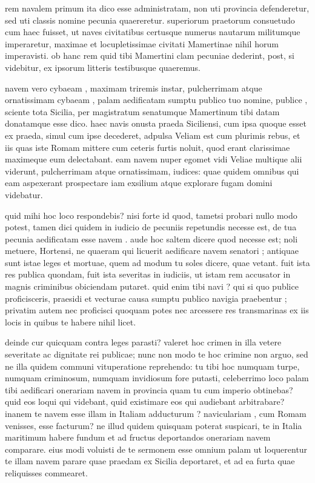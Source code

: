  rem navalem primum ita dico esse administratam, non uti provincia defenderetur, sed uti classis nomine pecunia quaereretur. superiorum praetorum consuetudo cum haec fuisset, ut naves civitatibus certusque numerus nautarum militumque imperaretur, maximae et locupletissimae civitati Mamertinae nihil horum imperavisti. ob hanc rem quid tibi Mamertini clam pecuniae dederint, post, si videbitur, ex ipsorum litteris testibusque quaeremus.

 navem vero cybaeam , maximam triremis instar, pulcherrimam atque ornatissimam cybaeam , palam aedificatam sumptu publico tuo nomine, publice , sciente tota Sicilia, per magistratum senatumque Mamertinum tibi datam donatamque esse dico. haec navis onusta praeda Siciliensi, cum ipsa quoque esset ex praeda, simul cum ipse decederet, adpulsa Veliam est cum plurimis rebus, et iis quas iste Romam mittere cum ceteris furtis noluit, quod erant clarissimae maximeque eum delectabant. eam navem nuper egomet vidi Veliae multique alii viderunt, pulcherrimam atque ornatissimam, iudices: quae quidem omnibus qui eam aspexerant prospectare iam exsilium atque explorare fugam domini videbatur.

 quid mihi hoc loco respondebis? nisi forte id quod, tametsi probari nullo modo potest, tamen dici quidem in iudicio de pecuniis repetundis necesse est, de tua pecunia aedificatam esse navem . aude hoc saltem dicere quod necesse est; noli metuere, Hortensi, ne quaeram qui licuerit aedificare navem senatori ; antiquae sunt istae leges et mortuae, quem ad modum tu soles dicere, quae vetant. fuit ista res publica quondam, fuit ista severitas in iudiciis, ut istam rem accusator in magnis criminibus obiciendam putaret. quid enim tibi navi ? qui si quo publice proficisceris, praesidi et vecturae causa sumptu publico navigia praebentur ; privatim autem nec proficisci quoquam potes nec arcessere res transmarinas ex iis locis in quibus te habere nihil licet.

 deinde cur quicquam contra leges parasti? valeret hoc crimen in illa vetere severitate ac dignitate rei publicae; nunc non modo te hoc crimine non arguo, sed ne illa quidem communi vituperatione reprehendo: tu tibi hoc numquam turpe, numquam criminosum, numquam invidiosum fore putasti, celeberrimo loco palam tibi aedificari onerariam navem in provincia quam tu cum imperio obtinebas? quid eos loqui qui videbant, quid existimare eos qui audiebant arbitrabare? inanem te navem esse illam in Italiam adducturum ? naviculariam , cum Romam venisses, esse facturum? ne illud quidem quisquam poterat suspicari, te in Italia maritimum habere fundum et ad fructus deportandos onerariam navem comparare. eius modi voluisti de te sermonem esse omnium palam ut loquerentur te illam navem parare quae praedam ex Sicilia deportaret, et ad ea furta quae reliquisses commearet.

